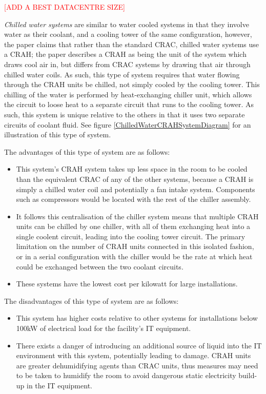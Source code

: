 \textcolor{red}{[ADD A BEST DATACENTRE SIZE]}
   
\emph{Chilled water systems} are similar to water cooled systems in that they involve water as their coolant, and a cooling tower of the same configuration, however, the paper claims that rather than the standard \gls{CRAC}, chilled water systems use a \gls{CRAH}; the paper describes a \gls{CRAH} as being the unit of the system which draws cool air in, but differs from \gls{CRAC} systems by drawing that air through chilled water coils.
As such, this type of system requires that water flowing through the \gls{CRAH} units be chilled, not simply cooled by the cooling tower. This chilling of the water is performed by heat-exchanging chiller unit, which allows the circuit to loose heat to a separate circuit that runs to the cooling tower. As such, this system is unique relative to the others in that it uses two separate circuits of coolant fluid. See figure \ref{ChilledWaterCRAHSystemDiagram} for an illustration of this type of system.

The advantages of this type of system are as follows:
\begin{itemize}
   \item This system's \gls{CRAH} system takes up less space in the room to be cooled than the equivalent \gls{CRAC} of any of the other systems, because a \gls{CRAH} is simply a chilled water coil and potentially a fan intake system. Components such as compressors would be located with the rest of the chiller assembly. 
   \item It follows this centralisation of the chiller system means that multiple \gls{CRAH} units can be chilled by one chiller, with all of them exchanging heat into a single coolent circuit, leading into the cooling tower circuit. The primary limitation on the number of \gls{CRAH} units connected in this isolated fashion, or in a serial configuration with the chiller would be the rate at which heat could be exchanged between the two coolant circuits.
   \item These systems have the lowest cost per kilowatt for large installations.
\end{itemize}

The disadvantages of this type of system are as follows:
\begin{itemize}
   \item This system has higher costs relative to other systems for installations below 100kW of electrical load for the facility's IT equipment.
   \item There exists a danger of introducing an additional source of liquid into the IT environment with this system, potentially leading to damage.
   \gls{CRAH} units are greater dehumidifying agents than \gls{CRAC} units, thus measures may need to be taken to humidify the room to avoid dangerous static electricity build-up in the IT equipment.
\end{itemize}

